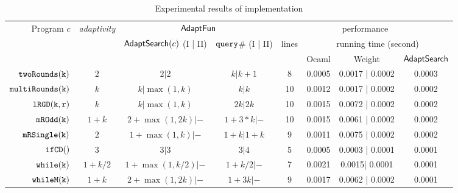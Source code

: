 {\footnotesize
\begin {table}[H]
\vspace{-0.5cm}
    \caption{Experimental results of {\THESYSTEM} implementation}
    \vspace{-0.5cm}
        \label{tb:adapt-imp}
        \begin{center}
        \centering
{\scriptsize
        \begin{tabular}{ r | c | c | c | c | c | c | c  }
        \multirow{3}{*}{Program $c$} & 
        \multirow{3}{*}{\emph{adaptivity}}
         & \multicolumn{2}{c|}{$\textsf{AdaptFun}$}
         & \multicolumn{4}{c}{performance} \\ 
         \cline{3-8}
         & & \multirow{2}{*}{$\mathsf{AdaptSearch}(c)$ (I | II) } & \multirow{2}{*}{${\tt query}$\# (I | II) } & \multirow{2}{*}{lines} & \multicolumn{3}{c}{running time (second)} \\ 
         \cline{6-8}
         & & & &  & Ocaml & Weight & $\mathsf{AdaptSearch}$  \\
         \hline \hline
         $  \mathtt{twoRounds(k)}$ & $2$ &  $2| 2$ & $k| k+1$ & 8 & 0.0005 & 0.0017 | 0.0002 & 0.0003 \\
         $  \mathtt{multiRounds(k)}$ & $k$ &  $k| \max(1,k)$ & $k| k$  &  10 & 0.0012 & 0.0017 | 0.0002 & 0.0002 \\
         $  \mathtt{lRGD(k, r)}$ & $k$ & $k | \max(1,k) $ & $ 2k | 2k$  &  10 & 0.0015 & 0.0072 | 0.0002 & 0.0002  \\
         $  \mathtt{mROdd(k)}$ & $1 + k$ &  $2+\max(1,2k) | - $ & $1 + 3*k | - $  &  10 & 0.0015 & 0.0061 | 0.0002 & 0.0002 \\
         $  \mathtt{mRSingle(k)}$    & $2$ &  $1+ \max(1, k) | -$ & $1 + k | 1 + k$  &  9 & 0.0011 & 0.0075 | 0.0002 & 0.0002 \\
         $  \mathtt{ifCD()}$ & $3$ & $3 | 3$ &   $3| 4$  & 5 & 0.0005 & 0.0003 | 0.0001  & 0.0001 \\
         $  \mathtt{while(k)}$ & $1+k/2$ &   $1 +\max(1, k/2) |- $  &  $1+k/2 | - $ & 7 & 0.0021 & 0.0015| 0.0001 &  0.0001 \\
         $  \mathtt{whileM(k)}$ & $1 + k$ &  $ 2 + \max(1,2k) | -$ & $1 + 3k | -$  &  9 & 0.0017 & 0.0062 | 0.0002 & 0.0001  \\

\end{tabular}}
\end{center}
\end{table}}
